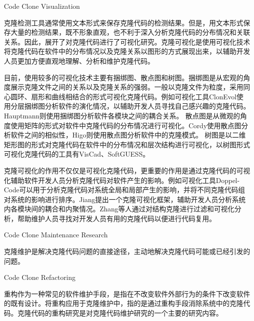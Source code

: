 {Code Clone Visualization}

克隆检测工具通常使用文本形式来保存克隆代码的检测结果。但是，用文本形式保存大量的检测结果，既不形象直观，也不利于深入分析克隆代码的分布情况和关联关系。因此，展开了对克隆代码进行了可视化研究。克隆可视化是使用可视化技术将克隆代码在软件中的分布情况以及克隆关系以图形的方式展现出来，以辅助开发人员更加方便直观地理解、分析和维护克隆代码。

目前，使用较多的可视化技术主要有捆绑图、散点图和树图。捆绑图是从宏观的角度展示克隆文件之间的关系以及克隆关系的强弱。一般以克隆文件为粒度，采用同心圆环、扇形和曲线相结合的形式可视化克隆代码\cite{hanjalic2013clonevol}\cite{hauptmann2012using}\cite{voinea2014visual}。例如可视化工具ClonEvol使用分层捆绑图分析软件的演化情况，以辅助开发人员寻找自己感兴趣的克隆代码\cite{hanjalic2013clonevol}。Hauptmann则使用捆绑图分析软件各模块之间的耦合关系\cite{hauptmann2012using}。
散点图是从微观的角度使用矩阵的形式对软件中克隆代码的分布情况进行可视化\cite{cordy2011exploring}\cite{higo2007method}\cite{livieri2007very}。Cordy使用散点图分析软件之间的相似性\cite{cordy2011exploring}，Higo则使用散点图分析软件中的克隆模式\cite{higo2007method}\cite{livieri2007very}。
树图是以二维矩形图的形式对克隆代码在软件中的分布情况和层次结构进行可视化，以树图形式可视化克隆代码的工具有VisCad\cite{asaduzzaman2011viscad}\cite{uddin2015comprehension}、SoftGUESS\cite{adar2007softguess}。

克隆可视化的作用不仅仅是可视化克隆代码，更重要的作用是通过克隆代码的可视化辅助软件开发人员分析克隆代码对软件产生的影响。例如可视化工具Doppel-Code可以用于分析克隆代码对系统全局和局部产生的影响，并将不同克隆代码组对系统的影响进行排序\cite{forbes2012doppel}。Jiang提出一个克隆可视化框架，辅助开发人员分析系统内各模块间的耦合和内聚情况\cite{jiang2007framework}\cite{jiang2006visualizing}。Zhang等人通过对结构克隆进行过滤和可视化分析，帮助维护人员寻找对开发人员有用的克隆代码以便进行代码复用\cite{zhang2008query}。

{Code Clone Maintenance Research}


克隆维护是解决克隆代码问题的直接途径，主动地解决克隆代码可能或已经引发的问题。%

{Code Clone Refactoring}
\label{ref-clonerefactoring}

重构作为一种常见的软件维护手段，是指在不改变软件外部行为的条件下改变软件的既有设计\cite{kerievsky2006重构与模式}。将重构应用于克隆维护中，指的是通过重构手段消除系统中的克隆代码。克隆代码的重构研究是对克隆代码维护研究的一个主要的研究内容。

